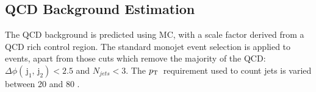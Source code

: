 
\subsection{QCD Background Estimation}
\label{section:QCD}
The QCD background is predicted using MC, with a scale factor derived from a QCD rich control region.
The standard monojet event selection is applied to events, apart from those cuts which remove the majority of the QCD: $\Delta \phi(\,\mathrm{j}_1, \,\mathrm{j}_2)<2.5$ and $N_{jets} < 3$.
The $p_{\text{T}}\,$ requirement used to count jets is varied between 20 and 80 \GeV. 

